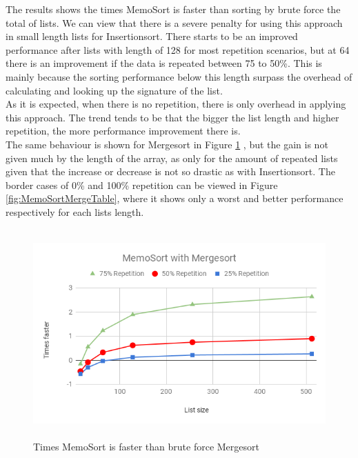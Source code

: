 \documentclass[a4paper,12pt]{article}
\begin{document}
The results shows the times MemoSort is faster than sorting by brute force the total of lists. We can view that there is a severe penalty for using this approach in small length lists for Insertionsort. There starts to be an improved performance after lists with length of 128 for most repetition scenarios, but at 64 there is an improvement if the data is repeated between 75 to 50\%. This is  mainly because the sorting performance below this length surpass the overhead of calculating and looking up the signature of the list. \\
As it is expected, when there is no repetition, there is only overhead in applying this approach. The trend tends to be that the bigger the list length and higher repetition, the more performance improvement there is. \\

The same behaviour is shown for Mergesort in Figure  \ref{fig:MemoSortMergeGraph} , but the gain is not given much by the length of the array, as only for the amount of repeated lists given that the increase or decrease is not so drastic as with Insertionsort. The border cases of 0\% and 100\% repetition can be viewed in Figure \ref{fig:MemoSortMergeTable}, where it shows only a worst and better performance respectively for each lists length.

\begin{figure}[H]
    \centering
    \includegraphics[height=8cm,keepaspectratio]{./images/MemoSortMerge.png}
    \caption{Times MemoSort is faster than brute force Mergesort }
    \label{fig:MemoSortMergeGraph}
\end{figure}
\end{document}
